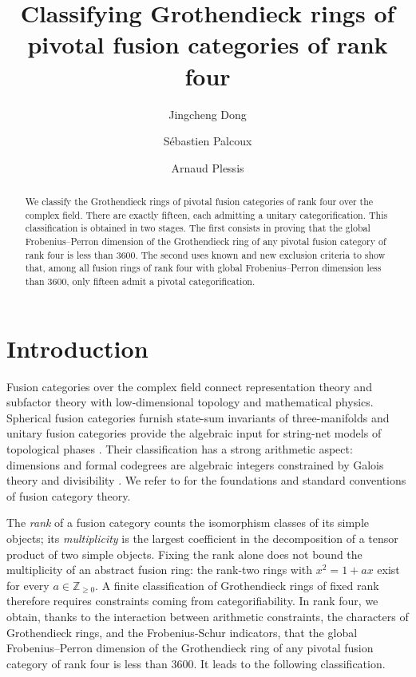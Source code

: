 \documentclass[11pt]{amsart}
\title[Pivotal Grothendieck rings of rank four]{Classifying Grothendieck rings of pivotal fusion categories of rank four}
\author{Jingcheng Dong}
\author{S\'ebastien Palcoux}
\author{Arnaud Plessis}
\date{}
\theoremstyle{definition}
\newcommand{\Z}{\mathbb Z}
\numberwithin{equation}{section}
\begin{document}
\begin{abstract}
We classify the Grothendieck rings of pivotal fusion categories of rank four over the complex field. There are exactly fifteen, each admitting a unitary categorification. 
This classification is obtained in two stages. 
The first consists in proving that the global Frobenius--Perron dimension of the Grothendieck ring of any pivotal fusion category of rank four is less than $3600$. 
The second uses known and new exclusion criteria to show that, among all fusion rings of rank four with global Frobenius--Perron dimension less than $3600$, only fifteen admit a pivotal categorification.
\end{abstract}
\maketitle
\setcounter{tocdepth}{2}
\tableofcontents

\section{Introduction}
Fusion categories over the complex field connect representation theory
and subfactor theory with low-dimensional topology and mathematical
physics. Spherical fusion categories furnish state-sum invariants of
three-manifolds \cite{BarrettWestbury} and unitary fusion categories
provide the algebraic input for string-net models of topological phases
\cite{LevinWen}. Their classification has a strong arithmetic aspect:
dimensions and formal codegrees are algebraic integers constrained by
Galois theory and divisibility \cite{ENO,OstrikCodegrees}.
We refer to \cite{EGNO} for the foundations and standard conventions of
fusion category theory.

The \emph{rank} of a fusion category counts the isomorphism classes of
its simple objects; its \emph{multiplicity} is the largest coefficient
in the decomposition of a tensor product of two simple objects.
Fixing the rank alone does not bound the multiplicity of an abstract
fusion ring: the rank-two rings with $x^2=1+ax$ exist for every
$a\in\Z_{\geq0}$. A finite classification of Grothendieck rings of fixed rank therefore requires
constraints coming from categorifiability.
In rank four, we obtain, thanks to the interaction between arithmetic constraints, the characters of Grothendieck rings, and the Frobenius-Schur indicators, that the global Frobenius--Perron dimension of the Grothendieck ring of any pivotal fusion category of rank four is less than $3600$.  
It leads to the following classification.
\end{document}
